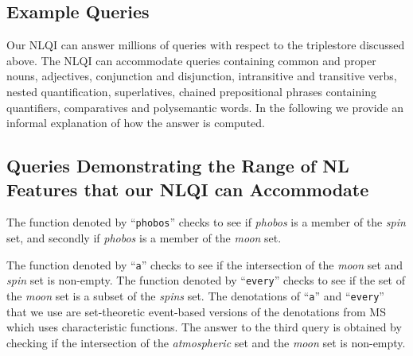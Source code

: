 \documentclass[../main.tex]{subfiles}
\begin{document}
\begin{refsection}
\section{Example Queries}
\label{webist2019conf:examples}

Our NLQI can answer millions of queries with respect to the triplestore discussed above. The NLQI can accommodate queries containing common and proper nouns, adjectives, conjunction and disjunction, intransitive and transitive verbs, nested quantification, superlatives, chained prepositional phrases containing quantifiers, comparatives and polysemantic words. In the following we provide an informal explanation of how the answer is computed.

\subsection{Queries Demonstrating the Range of NL Features that our NLQI can Accommodate}
\label{webist2019conf:nlexamples}



\examplespacing

\noindent The function denoted by ``\texttt{phobos}'' checks to see if \textit{phobos} is a member of the \textit{spin} set, and secondly if \textit{phobos} is a member of the \textit{moon} set.

\examplespacing




\examplespacing

\noindent The function denoted by ``\texttt{a}'' checks to see if the intersection of the \textit{moon} set and \textit{spin} set is non-empty. The function denoted by ``\texttt{every}'' checks to see if the set of the \textit{moon} set is a subset of the \textit{spins} set. The denotations of ``\texttt{a}'' and ``\texttt{every}'' that we use are set-theoretic event-based versions of the denotations from MS which uses characteristic functions.
The answer to the third query is obtained by checking if the intersection of the \textit{atmospheric} set and the \textit{moon} set is non-empty.

\examplespacing



\end{refsection}
\end{document}
